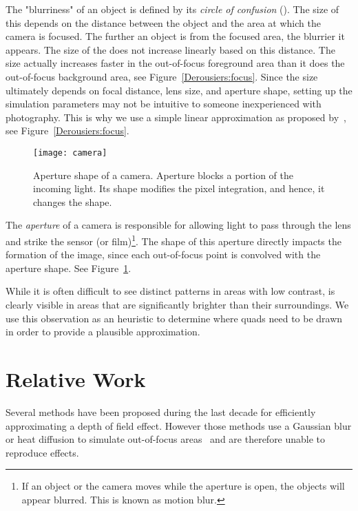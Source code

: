 The "blurriness" of an object is defined by its \emph{circle of confusion} (\coc). The size of this \coc depends on the distance between the object and the area at which the camera is focused. The further an object is from the focused area, the blurrier it appears. The size of the \coc does not increase linearly based on this distance. The size actually increases faster in the out-of-focus foreground area than it does the out-of-focus background area, see Figure~\ref{Derousiers:focus}. Since the \coc size ultimately depends on focal distance, lens size, and aperture shape, setting up the simulation parameters may not be intuitive to someone inexperienced with photography. This is why we use a simple linear approximation as proposed by~\cite{Hammon07}, see Figure~\ref{Derousiers:focus}.

	\begin{figure}[htb]\centering
	\texttt{[image: camera]}
	\caption{Aperture shape of a camera. Aperture blocks a portion of the incoming light. Its shape modifies the pixel integration, and hence, it changes the \bokeh shape. }
	\label{Derousiers:camera}
	\end{figure}

The \textit{aperture} of a camera is responsible for allowing light to pass through the lens and strike the sensor (or film)\footnote{If an object or the camera moves while the aperture is open, the objects will appear blurred. This is known as motion blur.}. The shape of this aperture directly impacts the formation of the image, since each out-of-focus point is convolved with the aperture shape. See Figure~\ref{Derousiers:camera}.

While it is often difficult to see distinct \bokeh patterns in areas with low contrast, \bokeh is clearly visible in areas that are significantly brighter than their surroundings. We use this observation as an heuristic to determine where \bokeh quads need to be drawn in order to provide a plausible approximation.

\section{Relative Work}\label{Derousiers:RelativeWork}

Several methods have been proposed during the last decade for efficiently approximating a depth of field effect. However those methods use a Gaussian blur or heat diffusion to simulate out-of-focus areas~\cite{Hammon07,Kosloff07} and are therefore unable to reproduce \bokeh effects.

